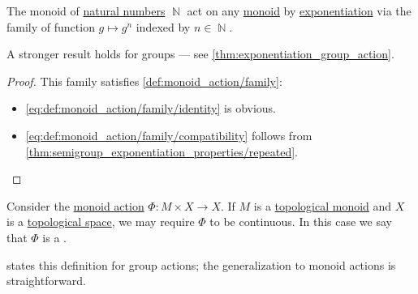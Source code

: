 \begin{proposition}\label{thm:exponentiation_monoid_action}
  The monoid of \hyperref[def:natural_numbers]{natural numbers} \( \BbbN \) act on any \hyperref[def:monoid]{monoid} by \hyperref[def:monoid/exponentiation]{exponentiation} via the family of function \( g \mapsto g^n \) indexed by \( n \in \BbbN \).
\end{proposition}
\begin{comments}
  \item A stronger result holds for groups --- see \cref{thm:exponentiation_group_action}.
\end{comments}
\begin{proof}
  This family satisfies \cref{def:monoid_action/family}:
  \begin{itemize}
    \item \ref{eq:def:monoid_action/family/identity} is obvious.
    \item \ref{eq:def:monoid_action/family/compatibility} follows from \cref{thm:semigroup_exponentiation_properties/repeated}.
  \end{itemize}
\end{proof}

\begin{definition}\label{def:continuous_monoid_action}
  Consider the \hyperref[def:monoid_action]{monoid action} \( \Phi: M \times X \to X \). If \( M \) is a \hyperref[def:topological_semigroup]{topological monoid} and \( X \) is a \hyperref[def:topological_space]{topological space}, we may require \( \Phi \) to be continuous. In this case we say that \( \Phi \) is a .
\end{definition}
\begin{comments}
  \item \Textcite{Lee2012SmoothManifolds} states this definition for group actions; the generalization to monoid actions is straightforward.
\end{comments}

